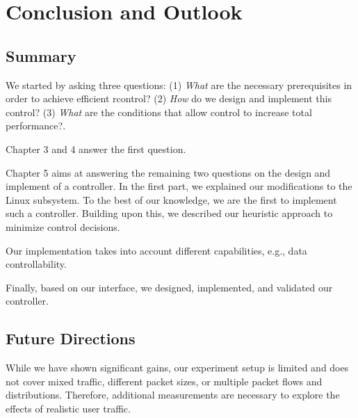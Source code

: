 \chapter{Conclusion and Outlook}
\label{chap:conclusion}


\section{Summary}

We started by asking three questions: (1) \textit{What} are the necessary prerequisites in order to achieve efficient rcontrol? (2) \textit{How} do we design and implement this control? (3) \textit{What} are the conditions that allow control to increase total performance?.

Chapter 3 and 4 answer the first question.
%

Chapter 5 aims at answering the remaining two questions on the design and implement of a controller.
%
In the first part, we explained our modifications to the Linux subsystem.
%
To the best of our knowledge, we are the first to implement such a controller. 
%
Building upon this, we described our heuristic approach to minimize control decisions.
%


Our implementation takes into account different capabilities, e.g., data controllability.

Finally, based on our interface, we designed, implemented, and validated our controller.
%


\section{Future Directions}


While we have shown significant gains, our experiment setup is limited and does not cover mixed traffic, different packet sizes, or multiple packet flows and distributions.
%
Therefore, additional measurements are necessary to explore the effects of realistic user traffic.
%
